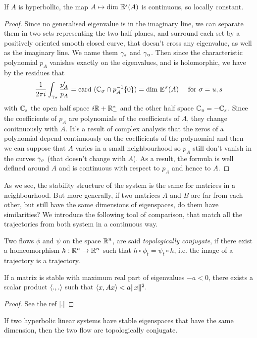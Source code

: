 \begin{theoreme}
If $A$ is hyperbollic, the map $A\mapsto \text{dim }\mathbb{E}^s(A)$ is continuous, so locally constant.
\end{theoreme}
\begin{proof}
Since no generalised eigenvalue is in the imaginary line, we can separate them in two sets representing the two half planes, and surround each set by a positively oriented smooth closed curve, that doesn't cross any eigenvalue, as well as the imaginary line. We name them $\gamma_s$ and $\gamma_u$. Then since the characteristic polynomial $p_A$ vanishes exactly on the eigenvalues, and is holomorphic, we have by the residues that 
$$\frac{1}{2\pi i}\int_{\gamma_\sigma} \frac{p_A'}{p_A}
= \text{card } (\mathbb{C}_\sigma\cap p_A^{-1}\{0\}) 
= \text{dim }\mathbb{E}^\sigma(A) \text{ \quad for } \sigma=u,s $$
with $\mathbb{C}_s$ the open half space $i\mathbb{R}+\mathbb{R}^*_-$ and the other half space $\mathbb{C}_u=-\mathbb{C}_s$. Since the coefficients of $p_A$ are polynomials of the coefficients of $A$, they change conitnuously with $A$. It's a result of complex analysis that the zeros of a polynomial depend continuously on the coefficients of the polynomial and then we can suppose that $A$ varies in a small neighbourhood so $p_A$ still don't vanish in the curves $\gamma_\sigma$ (that doesn't change with $A$). As a result, the formula is well defined around $A$ and is continuous with respect to $p_A$ and hence to $A$.
\end{proof}
 As we see, the stability structure of the system is the same for matrices in a neighbourhood. But more generally, if two matrices $A$ and $B$ are far from each other, but still have the same dimensions of eigenspaces, do them have similarities? We introduce the following tool of comparison, that match all the trajectories from both system in a continuous way. 
 \begin{definition}
 Two flows $\phi$ and $\psi$ on the space $\mathbb{R}^n$, are said \emph{topologically conjugate}, if there exist a homeomorphism $h:\mathbb{R}^n\to\mathbb{R}^n$ such that 
 $h\circ \phi_t = \psi_t\circ h$, i.e. the image of a trajectory is a trajectory. 
 \end{definition}
 \begin{lemme} \label{lem:ps}
If a matrix is stable with maximum real part of eigenvalues $-a<0$, there exists a scalar product $\langle .,.\rangle$ such that $\langle x,Ax\rangle<a\|x\|^2$.
\end{lemme}
\begin{proof}
See the ref [.]
\end{proof}
\begin{theoreme}
If two hyperbolic linear systems have stable eigenspaces that have the same dimension, then the two flow are topologically conjugate.
\end{theoreme}
